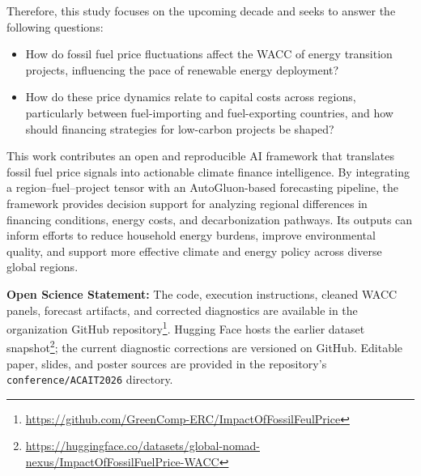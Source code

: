 Therefore, this study focuses on the upcoming decade and seeks to answer the following questions:
\begin{itemize}
    \item How do fossil fuel price fluctuations affect the WACC of energy transition projects, influencing the pace of renewable energy deployment?
    \item How do these price dynamics relate to capital costs across regions, particularly between fuel-importing and fuel-exporting countries, and how should financing strategies for low-carbon projects be shaped?
\end{itemize}

This work contributes an open and reproducible AI framework that translates fossil fuel price signals into actionable climate finance intelligence. By integrating a region--fuel--project tensor with an AutoGluon-based forecasting pipeline, the framework provides decision support for analyzing regional differences in financing conditions, energy costs, and decarbonization pathways. Its outputs can inform efforts to reduce household energy burdens, improve environmental quality, and support more effective climate and energy policy across diverse global regions.



\textbf{Open Science Statement:} The code, execution instructions, cleaned WACC panels, forecast artifacts, and corrected diagnostics are available in the organization GitHub repository\footnote{\url{https://github.com/GreenComp-ERC/ImpactOfFossilFeulPrice}}. Hugging Face hosts the earlier dataset snapshot\footnote{\url{https://huggingface.co/datasets/global-nomad-nexus/ImpactOfFossilFuelPrice-WACC}}; the current diagnostic corrections are versioned on GitHub. Editable paper, slides, and poster sources are provided in the repository's \texttt{conference/ACAIT2026} directory.

